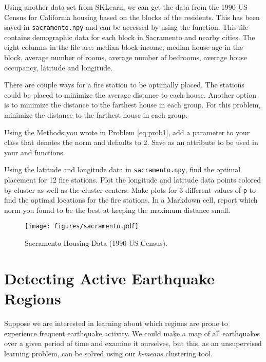 Using another data set from SKLearn, we can get the data from the 1990 US Census for California housing based on the blocks of the residents.
This has been saved in \texttt{sacramento.npy} and can be accessed by using the  function.
This file contains demographic data for each block in Sacramento and nearby cities.
The eight columns in the file are: median block income, median house age in the block, average number of rooms, average number of bedrooms, average house occupancy, latitude and longitude.

There are couple ways for a fire station to be optimally placed.
The stations could be placed to minimize the average distance to each house.
Another option is to minimize the distance to the farthest house in each group.
For this problem, minimize the distance to the farthest house in each group.

\begin{problem}
Using the Methods you wrote in Problem \ref{eq:prob1}, add a parameter  to your class that denotes the norm and defaults to 2.
Save  as an attribute to be used in your  and  functions.

Using the latitude and longitude data in \texttt{sacramento.npy}, find the optimal placement for 12 fire stations.
Plot the longitude and latitude data points colored by cluster as well as the cluster centers.
Make plots for 3 different values of \texttt{p} to find the optimal locations for the fire stations.
In a Markdown cell, report which norm you found to be the best at keeping the maximum distance small.
\label{eq:prob2}
\end{problem}
\begin{figure}[H]
	\centering
	\texttt{[image: figures/sacramento.pdf]}
	\caption{Sacramento Housing Data (1990 US Census).}
	\label{fig:sacramento}
\end{figure}

\section*{Detecting Active Earthquake Regions} %

Suppose we are interested in learning about which regions are prone to experience frequent earthquake activity.
We could make a map of all earthquakes over a given period of time and examine it ourselves, but this, as an unsupervised learning problem, can be solved using our \emph{k-means} clustering tool.

